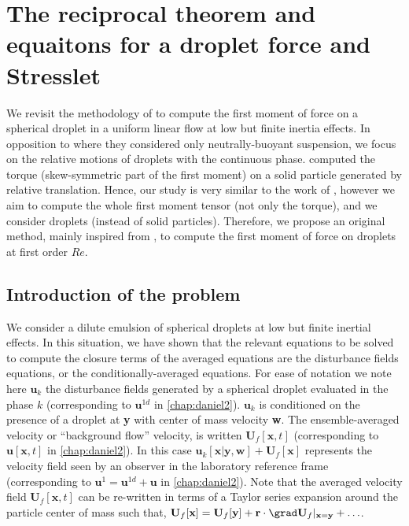 \section{The reciprocal theorem and equaitons for a droplet force and Stresslet}
\label{ap:reciprocal}


We revisit the methodology of \citet{stone2001inertial,raja2010inertial,jiang2021inertial}  to compute the first moment of force on a spherical droplet in a uniform linear flow at low but finite inertia effects. 
In opposition to \citet{stone2001inertial,raja2010inertial} where they considered only neutrally-buoyant suspension, we focus on the relative motions of droplets with the continuous phase. 
\citet{jiang2021inertial} computed the torque (skew-symmetric part of the first moment) on a solid particle generated by relative translation. 
Hence, our study is very similar to the work of \citet{jiang2021inertial}, however we aim to compute the whole first moment tensor (not only the torque), and we consider droplets (instead of solid particles). 
Therefore, we propose an original method, mainly inspired from \citet{stone2001inertial}, to compute the first moment of force on droplets at first order $Re$.  


\subsection{Introduction of the problem}

We consider a dilute emulsion of spherical droplets at low but finite inertial effects. 
In this situation, we have shown that the relevant equations to be solved to compute the closure terms of the averaged equations are the disturbance fields equations, or the conditionally-averaged equations. 
For ease of notation we note here $\textbf{u}_k$ the disturbance fields generated by a spherical droplet evaluated in the phase $k$ (corresponding to $\textbf{u}^{1d}$ in \ref{chap:daniel2}). 
$\textbf{u}_k$ is conditioned on the presence of a droplet at \textbf{y} with center of mass velocity \textbf{w}.
The ensemble-averaged velocity or ``background flow'' velocity, is written $\textbf{U}_f[\textbf{x},t]$ (corresponding to $\textbf{u}[\textbf{x},t]$ in \ref{chap:daniel2}). 
In this case $\textbf{u}_k[\textbf{x}|\textbf{y},\textbf{w}] + \textbf{U}_f[\textbf{x}]$ represents the velocity field seen by an observer in the laboratory reference frame (corresponding to $\textbf{u}^1 = \textbf{u}^{1d} + \textbf{u}$ in \ref{chap:daniel2}).
Note that the averaged velocity field $\textbf{U}_f[\textbf{x},t]$ can be re-written in terms of a Taylor series expansion around the particle center of mass such that, $\textbf{U}_f[\textbf{x}] = \textbf{U}_f[\textbf{y}] + \textbf{r} \cdot \grad \textbf{U}_f|_{\textbf{x} =\textbf{y}} + \ldots$. 

